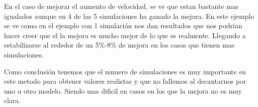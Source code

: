 \documentclass[]{article}
\begin{document}
En el caso de mejorar el aumento de velocidad, se ve que estan bastante mas igualados aunque en 4 de las 5 simulaciones ha ganado la mejora. En este ejemplo se ve como en el ejemplo con 1 simulación nos dan resultados que nos podrian hacer creer que el la mejora es mucho mejor de lo que es realmente. Llegando a estabilizarse al rededor de un 5\%-8\% de mejora en los casos que tienen mas simulaciones.

Como conclusión tenemos que el numero de simulaciones es muy importante en este metodo para obtener valores realistas y que no fallemos al decantarnos por uno u otro modelo. Siendo mas dificil en casos en los que la mejora no es muy clara.
\end{document}
